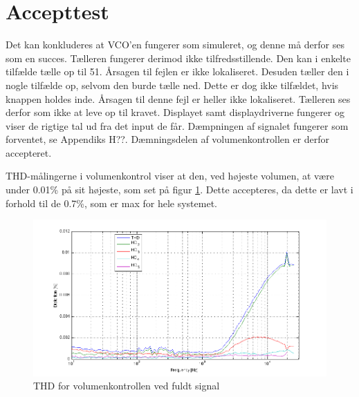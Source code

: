 \section{Accepttest}
\label{volumenkontrol-accepttest}
Det kan konkluderes at VCO'en fungerer som simuleret, og denne må derfor ses som en succes. Tælleren fungerer derimod ikke tilfredsstillende. Den kan i enkelte tilfælde tælle op til 51. Årsagen til fejlen er ikke lokaliseret. Desuden tæller den i nogle tilfælde op, selvom den burde tælle ned. Dette er dog ikke tilfældet, hvis knappen holdes inde. Årsagen til denne fejl er heller ikke lokaliseret. Tælleren ses derfor som ikke at leve op til kravet. Displayet samt displaydriverne fungerer og viser de rigtige tal ud fra det input de får.
Dæmpningen af signalet fungerer som forventet, se Appendiks H??. Dæmningsdelen af volumenkontrollen er derfor accepteret.

THD-målingerne i volumenkontrol viser at den, ved højeste volumen, at være under 0.01\% på sit højeste, som set på figur \ref{fig:accvold:thd0}. Dette accepteres, da dette er lavt i forhold til de 0.7\%, som er max for hele systemet. 
\begin{figure}[h]
\centering
\includegraphics[width=\textwidth]{maalerapporter/volumenkontrol/2Vniveau0-thd.png}
\caption{THD for volumenkontrollen ved fuldt signal}
\label{fig:accvold:thd0}
\end{figure}

